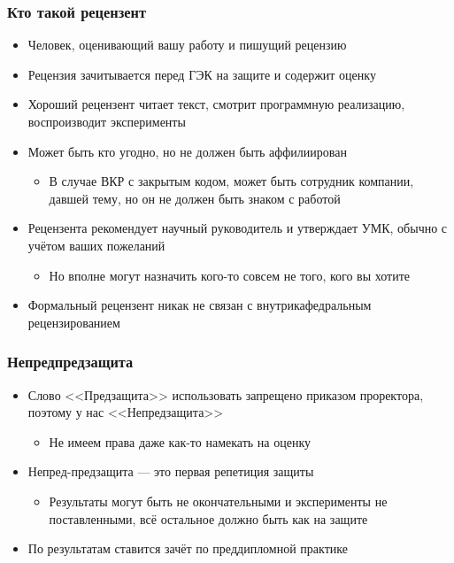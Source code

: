 \documentclass{../../slides-style}
\begin{document}
    \begin{frame}
        \frametitle{Кто такой рецензент}
        \begin{itemize}
            \item Человек, оценивающий вашу работу и пишущий рецензию
            \item Рецензия зачитывается перед ГЭК на защите и содержит оценку
            \item Хороший рецензент читает текст, смотрит программную реализацию, воспроизводит эксперименты
            \item Может быть кто угодно, но не должен быть аффилиирован
            \begin{itemize}
                \item В случае ВКР с закрытым кодом, может быть сотрудник компании, давшей тему, но он не должен быть знаком с работой
            \end{itemize}
            \item Рецензента рекомендует научный руководитель и утверждает УМК, обычно с учётом ваших пожеланий
            \begin{itemize}
                \item Но вполне могут назначить кого-то совсем не того, кого вы хотите
            \end{itemize}
            \item Формальный рецензент никак не связан с внутрикафедральным рецензированием
        \end{itemize}
    \end{frame}

    \begin{frame}
        \frametitle{Непредпредзащита}
        \begin{itemize}
            \item Слово <<Предзащита>> использовать запрещено приказом проректора, поэтому у нас <<Непредзащита>>
            \begin{itemize}
                \item Не имеем права даже как-то намекать на оценку
            \end{itemize}
            \item Непред-предзащита --- это первая репетиция защиты
            \begin{itemize}
                \item Результаты могут быть не окончательными и эксперименты не поставленными, всё остальное должно быть как на защите
            \end{itemize}
            \item По результатам ставится зачёт по преддипломной практике
        \end{itemize}
    \end{frame}
\end{document}
